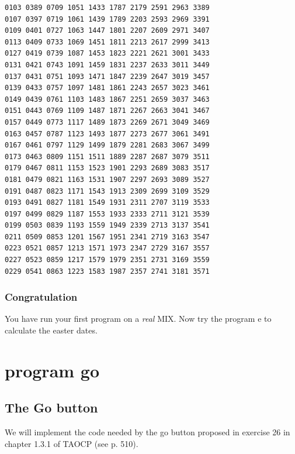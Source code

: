 \documentclass[a4paper,ngerman]{scrartcl}
\begin{document}
\begin{lstlisting}
0103 0389 0709 1051 1433 1787 2179 2591 2963 3389                    
0107 0397 0719 1061 1439 1789 2203 2593 2969 3391                    
0109 0401 0727 1063 1447 1801 2207 2609 2971 3407                    
0113 0409 0733 1069 1451 1811 2213 2617 2999 3413                    
0127 0419 0739 1087 1453 1823 2221 2621 3001 3433                    
0131 0421 0743 1091 1459 1831 2237 2633 3011 3449                    
0137 0431 0751 1093 1471 1847 2239 2647 3019 3457                    
0139 0433 0757 1097 1481 1861 2243 2657 3023 3461                    
0149 0439 0761 1103 1483 1867 2251 2659 3037 3463                    
0151 0443 0769 1109 1487 1871 2267 2663 3041 3467                    
0157 0449 0773 1117 1489 1873 2269 2671 3049 3469                    
0163 0457 0787 1123 1493 1877 2273 2677 3061 3491                    
0167 0461 0797 1129 1499 1879 2281 2683 3067 3499                    
0173 0463 0809 1151 1511 1889 2287 2687 3079 3511                    
0179 0467 0811 1153 1523 1901 2293 2689 3083 3517                    
0181 0479 0821 1163 1531 1907 2297 2693 3089 3527                    
0191 0487 0823 1171 1543 1913 2309 2699 3109 3529                    
0193 0491 0827 1181 1549 1931 2311 2707 3119 3533                    
0197 0499 0829 1187 1553 1933 2333 2711 3121 3539                    
0199 0503 0839 1193 1559 1949 2339 2713 3137 3541                    
0211 0509 0853 1201 1567 1951 2341 2719 3163 3547                    
0223 0521 0857 1213 1571 1973 2347 2729 3167 3557                    
0227 0523 0859 1217 1579 1979 2351 2731 3169 3559                    
0229 0541 0863 1223 1583 1987 2357 2741 3181 3571                    
\end{lstlisting}

\subsubsection{Congratulation}
You have run your first program on a \textit{real} MIX.
Now try the program e to calculate the easter dates.

\section{program go}
\subsection{The Go button}
We will implement the code needed by the go button proposed in  exercise 26 in chapter 1.3.1 of TAOCP (see p. 510).
\end{document}
